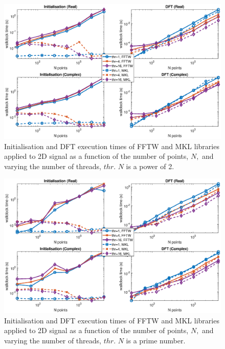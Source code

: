 \documentclass[a4paper]{article}
\begin{document}
\begin{figure}[htb]
    \centering
    \includegraphics[width=\linewidth]{../results/fftw_mkl_2_2d_thr.eps}
  \caption{Initialisation and DFT execution times of FFTW and MKL libraries applied to 2D signal as a function of the
    number of points, $N,$ and varying the number of threads, $thr.$ $N$ is a power of 2.}
  \label{2DFFTWMKL2}
\end{figure}


\begin{figure}[htb]
    \centering
    \includegraphics[width=\linewidth]{../results/fftw_mkl_prime_2d_thr.eps}
  \caption{Initialisation and DFT execution times of FFTW and MKL libraries applied to 2D signal as a function of the
    number of points, $N,$ and varying the number of threads, $thr.$ $N$ is a prime number.}
  \label{2DFFTWMKLPrime}
\end{figure}
\end{document}
